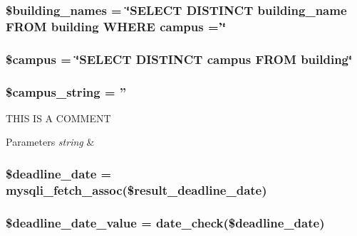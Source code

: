 \hypertarget{index_8php_a8ab55fcf525cc50064165d5b3e77e9a5}{
\subsubsection[{\$building\-\_\-names}]{\setlength{\rightskip}{0pt plus 5cm}\$building\-\_\-names = \char`\"{}\-S\-E\-L\-E\-C\-T \-D\-I\-S\-T\-I\-N\-C\-T building\-\_\-name \-F\-R\-O\-M building \-W\-H\-E\-R\-E campus ='\char`\"{}}}\label{index_8php_a8ab55fcf525cc50064165d5b3e77e9a5}
\hypertarget{index_8php_a6f0655994f3941d6ab50f681032f899b}{
\subsubsection[{\$campus}]{\setlength{\rightskip}{0pt plus 5cm}\$campus = \char`\"{}\-S\-E\-L\-E\-C\-T \-D\-I\-S\-T\-I\-N\-C\-T campus \-F\-R\-O\-M building\char`\"{}}}\label{index_8php_a6f0655994f3941d6ab50f681032f899b}
\hypertarget{index_8php_a9cbaf35082f8edc5439404467c593e5a}{
\subsubsection[{\$campus\-\_\-string}]{\setlength{\rightskip}{0pt plus 5cm}\$campus\-\_\-string = ''}}\label{index_8php_a9cbaf35082f8edc5439404467c593e5a}
\-T\-H\-I\-S \-I\-S \-A \-C\-O\-M\-M\-E\-N\-T 
\begin{DoxyParams}{\-Parameters}
{\em string} & \\
\hline
\end{DoxyParams}
\hypertarget{index_8php_af9a17edb1f4ed37105db8233956d2287}{
\subsubsection[{\$deadline\-\_\-date}]{\setlength{\rightskip}{0pt plus 5cm}\$deadline\-\_\-date = mysqli\-\_\-fetch\-\_\-assoc(\$result\-\_\-deadline\-\_\-date)}}\label{index_8php_af9a17edb1f4ed37105db8233956d2287}
\hypertarget{index_8php_a9eafe46b4e882510eb832a19390b28d5}{
\subsubsection[{\$deadline\-\_\-date\-\_\-value}]{\setlength{\rightskip}{0pt plus 5cm}\$deadline\-\_\-date\-\_\-value = {\bf date\-\_\-check}(\$deadline\-\_\-date)}}\label{index_8php_a9eafe46b4e882510eb832a19390b28d5}

